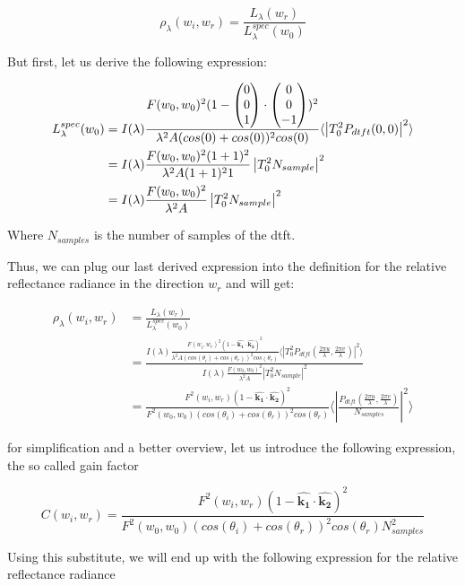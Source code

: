 \begin{equation}
    \rho_\lambda(w_i,w_r) = \frac{L_\lambda(w_r)}{L_\lambda^{spec}(w_0)}
\end{equation}

But first, let us derive the following expression:

\begin{align*}
L_\lambda^{spec}(w_0) 
& = I(\lambda) \frac{F(w_0, w_0)^2 (1-\colvec[0]{0}{1}\cdot\colvec[0]{0}{-1})^2}{\lambda^2 A (cos(0)+cos(0))^2 cos(0)} \langle \left|T_0^2 P_{dtft}(0,0)  \right|^2\rangle \\
& = I(\lambda) \frac{F(w_0, w_0)^2 (1+1)^2}{\lambda^2 A (1+1)^2 1}\left| T_0^2 N_{sample} \right|^2 \\
& = I(\lambda) \frac{F(w_0, w_0)^2}{\lambda^2 A}\left| T_0^2 N_{sample} \right|^2 
\end{align*}

Where $N_{samples}$ is the number of samples of the dtft.

Thus, we can plug our last derived expression into the definition for the relative reflectance radiance in the direction $w_r$ and will get:

\begin{align*}
\rho_\lambda(w_i,w_r)
& = \frac{L_\lambda(w_r)}{L_\lambda^{spec}(w_0)} \\
& = \frac{I(\lambda) \frac{F(w_i, w_r)^2 (1-\hat{\mathbf{k_1}}\cdot\hat{\mathbf{k_2}})^2}{\lambda^2 A (cos(\theta_i)+cos(\theta_r))^2 cos(\theta_r)} \langle \left|T_0^2 P_{dtft}(\frac{2\pi u}{\lambda}, \frac{2\pi v}{\lambda})  \right|^2\rangle}{I(\lambda) \frac{F(w_0, w_0)^2}{\lambda^2 A}\left| T_0^2 N_{sample} \right|^2 } \\
& = \frac{F^2(w_i,w_r)(1-\hat{\mathbf{k_1}}\cdot\hat{\mathbf{k_2}})^2}{F^2(w_0,w_0)(cos(\theta_i)+cos(\theta_r))^2 cos(\theta_r)}  \langle \left|\frac{P_{dtft}(\frac{2\pi u}{\lambda}, \frac{2\pi v}{\lambda})}{N_{samples}}\right|^2\rangle
\end{align*}

for simplification and a better overview, let us introduce the following expression, the so called gain factor

\begin{equation}
    C(w_i,w_r) = \frac{F^2(w_i,w_r)(1-\hat{\mathbf{k_1}}\cdot\hat{\mathbf{k_2}})^2}{F^2(w_0,w_0)(cos(\theta_i)+cos(\theta_r))^2 cos(\theta_r) N_{samples}^2}
\end{equation}

Using this substitute, we will end up with the following expression for the relative reflectance radiance


